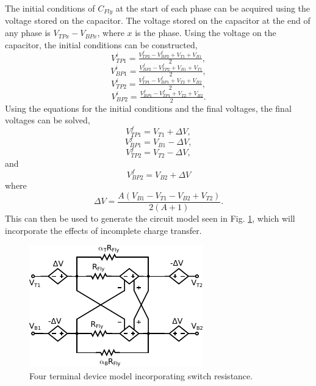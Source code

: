 \documentclass[conference]{IEEEtran}
\begin{document}
	The initial conditions of $C_{Fly}$ at the start of each phase can be acquired using the voltage stored on the capacitor. The voltage stored on the capacitor at the end of any phase is $V_{TPx} - V_{BPx}$, where $x$ is the phase. Using the voltage on the capacitor, the initial conditions can be constructed, 
	\begin{equation}
	V_{TP1}^i = \tfrac{V_{TP2}^f - V_{BP2}^f + V_{T1} + V_{B1}}{2},
	\end{equation}
	\begin{equation}
	V_{BP1}^i = \tfrac{V_{BP2}^f - V_{TP2}^f + V_{B1} + V_{T1}}{2},
	\end{equation}
	\begin{equation}
	V_{TP2}^i = \tfrac{V_{TP1}^f - V_{BP1}^f + V_{T2} + V_{B2}}{2},
	\end{equation}
	\begin{equation}
	V_{BP2}^i = \tfrac{V_{BP1}^f - V_{TP1}^f + V_{T2} + V_{B2}}{2}.
	\end{equation}
	Using the equations for the initial conditions and the final voltages, the final voltages can be solved,
	\begin{equation}
	V_{TP1}^f = V_{T1} + \Delta V, 
	\end{equation}
	\begin{equation}
	V_{BP1}^f = V_{B1} - \Delta V,
	\end{equation}
	\begin{equation}
	V_{TP2}^f = V_{T2} - \Delta V,
	\end{equation}
	and
	\begin{equation}
	V_{BP2}^f = V_{B2} + \Delta V
	\end{equation}
	where 
	\begin{equation}
	\Delta V = \frac{A(V_{B1} - V_{T1} - V_{B2} + V_{T2})}{2(A+1)}.
	\end{equation}
	This can then be used to generate the circuit model seen in Fig. \ref{Fig:Circ_Res}, which will incorporate the effects of incomplete charge transfer.
	
	\begin{figure}
		\centering
		\includegraphics[width=0.7\linewidth]{Figures/CellRes.pdf}
		\caption{Four terminal device model incorporating switch resistance.}
		\label{Fig:Circ_Res}
	\end{figure}
\end{document}
